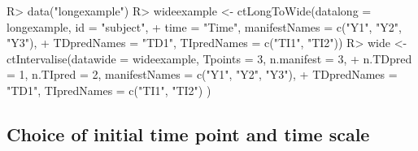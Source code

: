 \documentclass[nojss]{jss}\usepackage[]{graphicx}\usepackage[]{color}
\begin{document}
\begin{Schunk}
\begin{Sinput}
R> data("longexample")
R> wideexample <- ctLongToWide(datalong = longexample, id = "subject", 
+   time = "Time", manifestNames = c("Y1", "Y2", "Y3"), 
+   TDpredNames = "TD1", TIpredNames = c("TI1", "TI2"))
R> wide <- ctIntervalise(datawide = wideexample, Tpoints = 3, n.manifest = 3, 
+   n.TDpred = 1, n.TIpred = 2, manifestNames = c("Y1", "Y2", "Y3"), 
+   TDpredNames = "TD1", TIpredNames = c("TI1", "TI2") )
\end{Sinput}
\end{Schunk}

\subsection{Choice of initial time point and time scale} \label{sec:datatimescale}\nopagebreak
\end{document}
